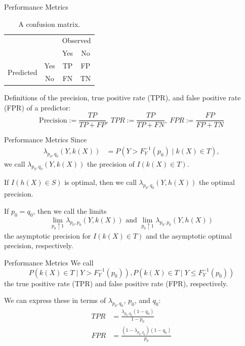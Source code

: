 \documentclass{beamer}
\begin{document}
\begin{frame}{Performance Metrics}
    \begin{table}[h]
        \centering
        \begin{tabular}{@{}cc|cc@{}}
            \multicolumn{1}{c}{} &\multicolumn{1}{c}{} &\multicolumn{2}{c}{Observed} \\ 
            \multicolumn{1}{c}{} & 
            \multicolumn{1}{c|}{} & 
            \multicolumn{1}{c}{Yes} & 
            \multicolumn{1}{c}{No} \\ 
            \cline{2-4}
            \multirow[c]{2}{*}{Predicted} %
            & Yes  & TP & FP   \\[1.5ex]
            & No  & FN   & TN \\ 
            \cline{2-4}
        \end{tabular}
        \caption{A confusion matrix.}
        \label{tab:conf_mat}
    \end{table}
    Definitions of the precision, true positive rate (TPR), and false positive rate (FPR) of a predictor:
    \[
    \text{Precision} := \frac{TP}{TP + FP}, \
    TPR := \frac{TP}{TP + FN}, \
    FPR := \frac{FP}{FP + TN}
    \]
\end{frame}

\begin{frame}{Performance Metrics}
    Since
    \begin{align*}
        \lambda_{p_0, q_0}(Y, k(X)) &= P(Y > F_Y^{-1}(p_0) \mid k(X) \in T),
    \end{align*}
    we call $\lambda_{p_0, q_0}(Y, k(X))$ the precision of $I(k(X) \in T)$.

    \medskip
    
    If $I(h(X) \in S)$ is optimal, then we call $\lambda_{p_0, q_0}(Y, h(X))$ the optimal precision.

    \medskip
    
    If $p_0 = q_0$, then we call the limits
    \[
    \lim_{p_0 \uparrow 1} \lambda_{p_0, p_0}(Y, k(X)) \text{ and } \lim_{p_0 \uparrow 1} \lambda_{p_0, p_0}(Y, h(X))
    \]
    the asymptotic precision for $I(k(X) \in T)$ and the asymptotic optimal precision, respectively.
\end{frame}

\begin{frame}{Performance Metrics}
    We call
    \[
    P(k(X) \in T \mid Y > F_Y^{-1}(p_0)), P(k(X) \in T \mid Y \le F_Y^{-1}(p_0))
    \]
    the true positive rate (TPR) and false positive rate (FPR), respectively.

    \medskip
    
    We can express these in terms of $\lambda_{p_0, q_0}$, $p_0$, and $q_0$:
    \begin{align*}
        TPR &= \frac{\lambda_{p_0, q_0}(1 - q_0)}{1 - p_0} \\
        FPR &= \frac{(1 - \lambda_{p_0, q_0})(1 - q_0)}{p_0}
    \end{align*}
\end{frame}
\end{document}
